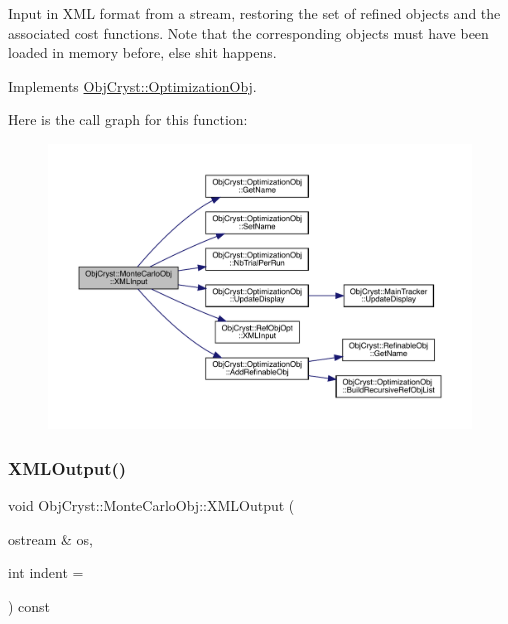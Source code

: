 Input in X\+ML format from a stream, restoring the set of refined objects and the associated cost functions. Note that the corresponding objects must have been loaded in memory before, else shit happens. 



Implements \mbox{\hyperlink{class_obj_cryst_1_1_optimization_obj_aa07aee60f56780e2c56fb20f4a5f48a8}{Obj\+Cryst\+::\+Optimization\+Obj}}.

Here is the call graph for this function\+:
\nopagebreak
\begin{figure}[H]
\begin{center}
\leavevmode
\includegraphics[width=350pt]{class_obj_cryst_1_1_monte_carlo_obj_a1b8be4dded36d1d2f882674decc5649c_cgraph}
\end{center}
\end{figure}
\mbox{\label{class_obj_cryst_1_1_monte_carlo_obj_a540de9354fcb298fca0458f041238f6e}} 
\subsubsection{\texorpdfstring{XMLOutput()}{XMLOutput()}}
{\footnotesize\ttfamily void Obj\+Cryst\+::\+Monte\+Carlo\+Obj\+::\+X\+M\+L\+Output (\begin{DoxyParamCaption}\item[{ostream \&}]{os,  }\item[{int}]{indent = {} }\end{DoxyParamCaption}) const\hspace{0.3cm}{\ttfamily [virtual]}}



